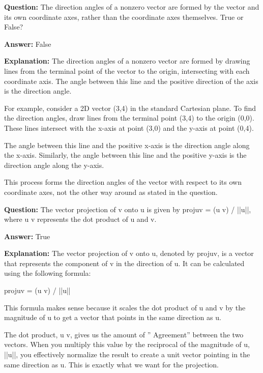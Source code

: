 \documentclass{article}
\begin{document}
            
                \textbf {Question:} The direction angles of a nonzero vector are formed by the vector and its own coordinate axes, rather than the coordinate axes themselves. True or False?
                
                \textbf{Answer:} False

                \textbf{Explanation:} The direction angles of a nonzero vector are formed by drawing lines from the terminal point of the vector to the origin, intersecting with each coordinate axis. The angle between this line and the positive direction of the axis is the direction angle.

For example, consider a 2D vector (3,4) in the standard Cartesian plane. To find the direction angles, draw lines from the terminal point (3,4) to the origin (0,0). These lines intersect with the x-axis at point (3,0) and the y-axis at point (0,4).

The angle between this line and the positive x-axis is the direction angle along the x-axis. Similarly, the angle between this line and the positive y-axis is the direction angle along the y-axis.

This process forms the direction angles of the vector with respect to its own coordinate axes, not the other way around as stated in the question.
                
                \vspace{0.5cm} 
        
            
                \textbf {Question:} The vector projection of v onto u is given by projuv = (u {\textperiodcentered} v) / ||u||, where u {\textperiodcentered} v represents the dot product of u and v.
                
                \textbf{Answer:} True

                \textbf{Explanation:} The vector projection of v onto u, denoted by projuv, is a vector that represents the component of v in the direction of u. It can be calculated using the following formula:

projuv = (u {\textperiodcentered} v) / ||u||

This formula makes sense because it scales the dot product of u and v by the magnitude of u to get a vector that points in the same direction as u.

The dot product, u {\textperiodcentered} v, gives us the amount of '' Agreement'' between the two vectors. When you multiply this value by the reciprocal of the magnitude of u, ||u||, you effectively normalize the result to create a unit vector pointing in the same direction as u. This is exactly what we want for the projection.
\end{document}
